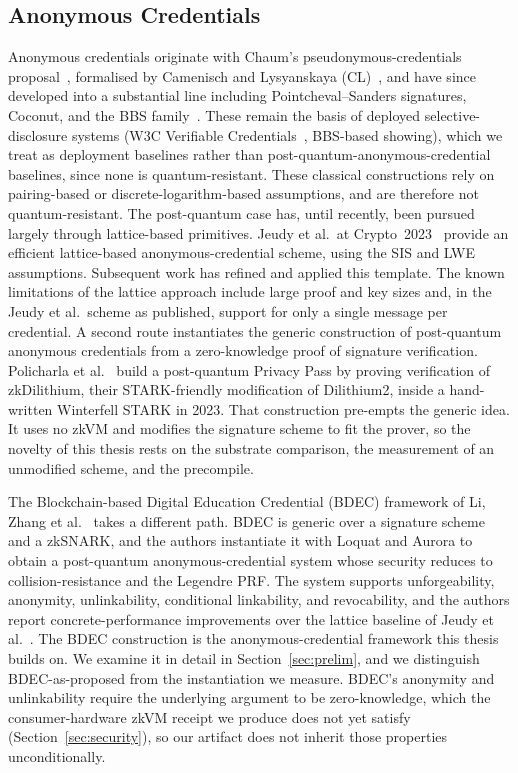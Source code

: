 \subsection{Anonymous Credentials}
Anonymous credentials originate with Chaum's pseudonymous-credentials proposal~\cite{chaum1985}, formalised by Camenisch and Lysyanskaya (CL)~\cite{camenisch2004signatures}, and have since developed into a substantial line including Pointcheval--Sanders signatures, Coconut, and the BBS family~\cite{pointchevalsanders2016,sonnino2019coconut,bbs04}. These remain the basis of deployed selective-disclosure systems (W3C Verifiable Credentials~\cite{w3cvc}, BBS-based showing), which we treat as deployment baselines rather than post-quantum-anonymous-credential baselines, since none is quantum-resistant.
These classical constructions rely on pairing-based or discrete-logarithm-based assumptions, and are therefore not quantum-resistant. The post-quantum case has, until recently, been pursued largely through lattice-based primitives. Jeudy et al.\ at Crypto~2023~\cite{jeudy2023lattice} provide an efficient lattice-based anonymous-credential scheme, using the SIS and LWE assumptions. Subsequent work has refined and applied this template. The known limitations of the lattice approach include large proof and key sizes and, in the Jeudy et al.\ scheme as published, support for only a single message per credential. A second route instantiates the generic construction of post-quantum anonymous credentials from a zero-knowledge proof of signature verification. Policharla et al.~\cite{policharla2023pqprivacypass} build a post-quantum Privacy Pass by proving verification of zkDilithium, their STARK-friendly modification of Dilithium2, inside a hand-written Winterfell STARK in 2023. That construction pre-empts the generic idea. It uses no zkVM and modifies the signature scheme to fit the prover, so the novelty of this thesis rests on the substrate comparison, the measurement of an unmodified scheme, and the precompile.

The Blockchain-based Digital Education Credential (BDEC) framework of Li, Zhang et al.~\cite{10.1007/978-981-96-0957-4_3} takes a different path. BDEC is generic over a signature scheme and a zkSNARK, and the authors instantiate it with Loquat and Aurora to obtain a post-quantum anonymous-credential system whose security reduces to collision-resistance and the Legendre PRF. The system supports unforgeability, anonymity, unlinkability, conditional linkability, and revocability, and the authors report concrete-performance improvements over the lattice baseline of Jeudy et al.~\cite{jeudy2023lattice}. The BDEC construction is the anonymous-credential framework this thesis builds on. We examine it in detail in Section~\ref{sec:prelim}, and we distinguish BDEC-as-proposed from the instantiation we measure. BDEC's anonymity and unlinkability require the underlying argument to be zero-knowledge, which the consumer-hardware zkVM receipt we produce does not yet satisfy (Section~\ref{sec:security}), so our artifact does not inherit those properties unconditionally.

